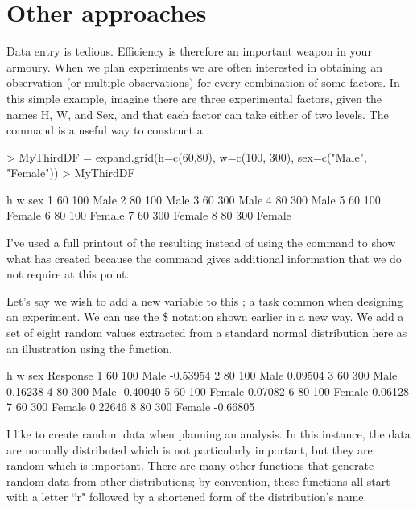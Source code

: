 \section{Other approaches}

Data entry is tedious. Efficiency is therefore an important weapon in your armoury. When we plan experiments we are often interested in obtaining an observation (or multiple observations) for every combination of some factors. In this simple example, imagine there are three experimental factors, given the names H, W, and Sex, and that each factor can take either of two levels. The  command is a useful way to construct a .
\begin{Schunk}
\begin{Sinput}
> MyThirdDF = expand.grid(h=c(60,80), w=c(100, 300), sex=c("Male", "Female"))
> MyThirdDF
\end{Sinput}
\begin{Soutput}
   h   w    sex
1 60 100   Male
2 80 100   Male
3 60 300   Male
4 80 300   Male
5 60 100 Female
6 80 100 Female
7 60 300 Female
8 80 300 Female
\end{Soutput}
\end{Schunk}

I've used a full printout of the resulting  instead of using the  command to show what \R{} has created because the  command gives additional information that we do not require at this point.

Let's say we wish to add a new variable to this ; a task common when designing an experiment. We can use the \$ notation shown earlier in a new way. We add a set of eight random values extracted from a standard normal distribution here as an illustration using the  function.
\begin{Schunk}
\begin{Soutput}
   h   w    sex Response
1 60 100   Male -0.53954
2 80 100   Male  0.09504
3 60 300   Male  0.16238
4 80 300   Male -0.40040
5 60 100 Female  0.07082
6 80 100 Female  0.06128
7 60 300 Female  0.22646
8 80 300 Female -0.66805
\end{Soutput}
\end{Schunk}

I like to create random data when planning an analysis. In this instance, the data are normally distributed which is not particularly important, but they are random which is important. There are many other functions that generate random data from other distributions; by convention, these functions all start with a letter ``r" followed by a shortened form of the distribution's name. 

